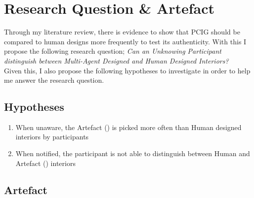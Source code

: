 \section{Research Question \& Artefact}


Through my literature review, there is evidence to show that PCIG should be compared to human designs more frequently to test its authenticity. With this I propose the following research question; \textit{Can an Unknowing Participant distinguish between Multi-Agent Designed and Human Designed Interiors?}
\\
Given this, I also propose the following hypotheses to investigate in order to help me answer the research question.

\subsection{Hypotheses}
\begin{enumerate}
    \item When unaware, the Artefact () is picked more often than Human designed interiors by participants
    \item When notified, the participant is not able to distinguish between Human and Artefact () interiors
\end{enumerate}

\subsection{Artefact}



